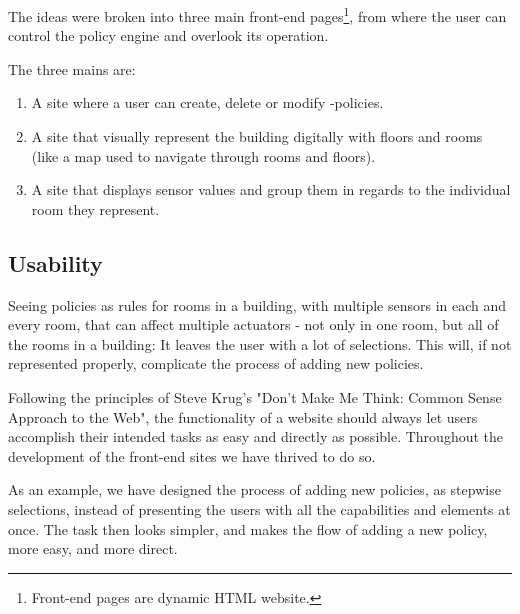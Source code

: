 The ideas were broken into three main front-end pages\footnote{Front-end pages are dynamic HTML website.}, from where the user can control the policy engine and overlook its operation.

The three mains are:
\begin{enumerate}
\item A site where a user can create, delete or modify -policies.
\item A site that visually represent the building digitally with floors and rooms (like a map used to navigate through rooms and floors).
\item A site that displays sensor values and group them in regards to the individual room they represent.
\end{enumerate}
	

\subsection{Usability}
Seeing policies as rules for rooms in a building, with multiple sensors in each and every room, that can affect multiple actuators - not only in one room, but all of the rooms in a building: It leaves the user with a lot of selections. 
This will, if not represented properly, complicate the process of adding new policies.

Following the principles of Steve Krug's "Don't Make Me Think: Common Sense Approach to the Web"\cite{Krug:2005:DMM:1051204}, the functionality of a website should always let users accomplish their intended tasks as easy and directly as possible.
Throughout the development of the front-end sites we have thrived to do so.

As an example, we have designed the process of adding new policies, as stepwise selections, instead of presenting the users with all the capabilities and elements at once.
The task then looks simpler, and makes the flow of  adding a new policy, more easy, and more direct.

